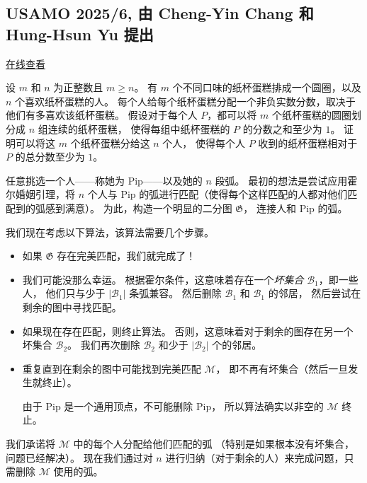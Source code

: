 \documentclass[11pt]{article}
\theoremstyle{claimstyle}
\theoremstyle{remarkstyle}
\begin{document}
\pagebreak

\subsection{USAMO 2025/6, 由 Cheng-Yin Chang 和 Hung-Hsun Yu 提出}
\href{https://aops.com/community/p34335840}{在线查看}

\begin{problembox}
设 $m$ 和 $n$ 为正整数且 $m\geq n$。
有 $m$ 个不同口味的纸杯蛋糕排成一个圆圈，以及 $n$ 个喜欢纸杯蛋糕的人。
每个人给每个纸杯蛋糕分配一个非负实数分数，取决于他们有多喜欢该纸杯蛋糕。
假设对于每个人 $P$，都可以将 $m$ 个纸杯蛋糕的圆圈划分成 $n$ 组连续的纸杯蛋糕，
使得每组中纸杯蛋糕的 $P$ 的分数之和至少为 $1$。
证明可以将这 $m$ 个纸杯蛋糕分给这 $n$ 个人，
使得每个人 $P$ 收到的纸杯蛋糕相对于 $P$ 的总分数至少为 $1$。
\end{problembox}

任意挑选一个人——称她为 Pip——以及她的 $n$ 段弧。
最初的想法是尝试应用霍尔婚姻引理，将
$n$ 个人与 Pip 的弧进行匹配（使得每个这样匹配的人都对他们匹配到的弧感到满意）。
为此，构造一个明显的二分图 $\mathfrak{G}$，
连接人和 Pip 的弧。

我们现在考虑以下算法，该算法需要几个步骤。
\begin{itemize}
  \item 如果 $\mathfrak{G}$ 存在完美匹配，我们就完成了！
  
  \item 我们可能没那么幸运。
  根据霍尔条件，这意味着存在一个\emph{坏集合} $\mathcal{B}_1$，即一些人，
  他们只与少于 $|\mathcal{B}_1|$ 条弧兼容。
  然后删除 $\mathcal{B}_1$ 和 $\mathcal{B}_1$ 的邻居，
  然后尝试在剩余的图中寻找匹配。
  
  \item 如果现在存在匹配，则终止算法。
  否则，这意味着对于剩余的图存在另一个坏集合 $\mathcal{B}_2$。
  我们再次删除 $\mathcal{B}_2$ 和少于 $|\mathcal{B}_2|$ 个的邻居。
  
  \item 重复直到在剩余的图中可能找到完美匹配 $\mathcal{M}$，
  即不再有坏集合（然后一旦发生就终止）。
  
  由于 Pip 是一个通用顶点，不可能删除 Pip，
  所以算法确实以非空的 $\mathcal{M}$ 终止。
\end{itemize}

我们承诺将 $\mathcal{M}$ 中的每个人分配给他们匹配的弧
（特别是如果根本没有坏集合，问题已经解决）。
现在我们通过对 $n$ 进行归纳（对于剩余的人）来完成问题，只需删除 $\mathcal{M}$ 使用的弧。
\end{document}
